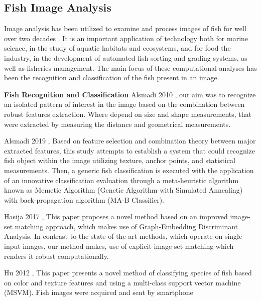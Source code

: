 

\subsection{Fish Image Analysis}

Image analysis has been utilized to examine and process images of fish
for well over two decades \cite{Zion2000InvivoFS}. It is an important
application of technology both for marine science, in the study of aquatic
habitats and ecosystems, and for food the industry, in the development
of automated fish sorting and grading systems, as well as fisheries
management. The main focus of
these computational analyses has been the recognition and classification 
of the fish present in an image.

\textbf{Fish Recognition and Classification}\newline
Alsmadi 2010 \cite{Alsmadi2010FishRB},
 our aim was to recognize an isolated pattern of interest in the image based on the combination between robust features extraction. Where depend on size and shape measurements, that were extracted by measuring the distance and geometrical measurements.

Alsmadi 2019 \cite{Alsmadi2019RFE},
Based on feature selection and combination theory between major extracted features, this study attempts to establish a system that could recognize fish object within the image utilizing texture, anchor points, and statistical measurements. Then, a generic fish classification is executed with the application of an innovative classification evaluation through a meta-heuristic algorithm known as Memetic Algorithm (Genetic Algorithm with Simulated Annealing) with back-propagation algorithm (MA-B Classifier).

Hasija 2017 \cite{Hasija2017FishSC},
This paper proposes a novel method based on an improved image-set matching approach, which makes use of Graph-Embedding Discriminant Analysis. In contrast to the state-of-the-art methods, which operate on single input images, our method makes, use of explicit image set matching which renders it robust computationally.

Hu 2012 \cite{HuJing2012Fscb},
This paper presents a novel method of classifying species of fish based on color and texture features and using a multi-class support vector machine (MSVM). Fish images were acquired and sent by smartphone


